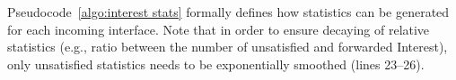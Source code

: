 

Pseudocode~\ref{algo:interest stats} formally defines how statistics can be generated for  each incoming interface. Note that in order to ensure decaying of relative statistics (e.g., ratio between the number of unsatisfied and forwarded Interest), only unsatisfied statistics needs to be exponentially smoothed (lines 23--26).  



